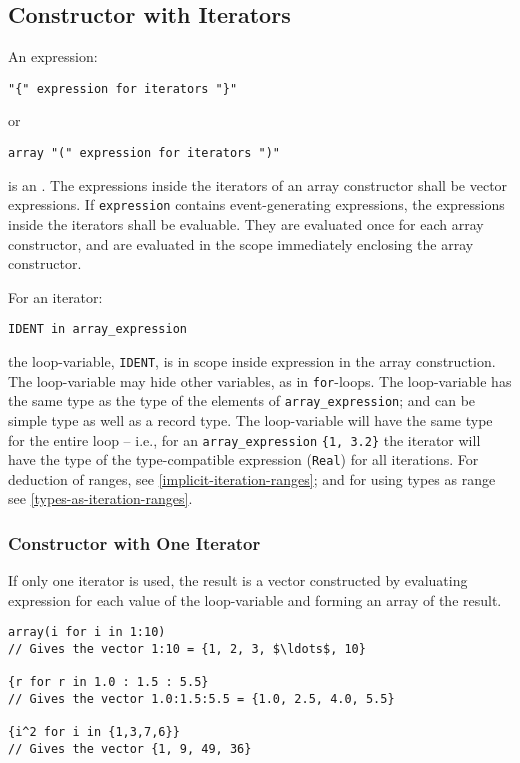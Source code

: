 \subsection{Constructor with Iterators}\label{array-constructor-with-iterators}\label{constructor-with-iterators}

An expression:
\begin{lstlisting}[language=grammar]
"{" expression for iterators "}"
\end{lstlisting}
or
\begin{lstlisting}[language=grammar]
array "(" expression for iterators ")"
\end{lstlisting}
is an .
The expressions inside the iterators of an array constructor shall be vector expressions.
If \lstinline!expression! contains event-generating expressions, the expressions inside the iterators shall be evaluable.
They are evaluated once for each array constructor, and are evaluated in the scope immediately enclosing the array constructor.

For an iterator:
\begin{lstlisting}[language=modelica]
IDENT in array_expression
\end{lstlisting}
the loop-variable, \lstinline!IDENT!, is in scope inside expression in the array construction.
The loop-variable may hide other variables, as in \lstinline!for!-loops.
The loop-variable has the same type as
the type of the elements of \lstinline!array_expression!; and can be simple type as well as a record type.
The loop-variable will have the same type for the entire loop -- i.e., for an
\lstinline!array_expression! \lstinline!{1, 3.2}! the iterator will have the type of the type-compatible expression (\lstinline!Real!) for all iterations.
For deduction of ranges, see
\cref{implicit-iteration-ranges}; and for using types as range see \cref{types-as-iteration-ranges}.

\subsubsection{Constructor with One Iterator}\label{array-constructor-with-one-iterator}\label{constructor-with-one-iterator}

If only one iterator is used, the result is a vector constructed by
evaluating expression for each value of the loop-variable and forming an
array of the result.

\begin{example}
\begin{lstlisting}[language=modelica]
array(i for i in 1:10)
// Gives the vector 1:10 = {1, 2, 3, $\ldots$, 10}

{r for r in 1.0 : 1.5 : 5.5}
// Gives the vector 1.0:1.5:5.5 = {1.0, 2.5, 4.0, 5.5}

{i^2 for i in {1,3,7,6}}
// Gives the vector {1, 9, 49, 36}
\end{lstlisting}
\end{example}


